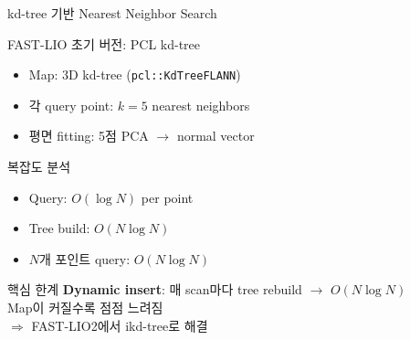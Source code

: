 \begin{frame}{kd-tree 기반 Nearest Neighbor Search}
  \begin{block}{FAST-LIO 초기 버전: PCL kd-tree}
    \begin{itemize}
      \item Map: 3D kd-tree (\texttt{pcl::KdTreeFLANN})
      \item 각 query point: $k=5$ nearest neighbors
      \item 평면 fitting: 5점 PCA $\to$ normal vector
    \end{itemize}
  \end{block}
  \pause
  \begin{block}{복잡도 분석}
    \begin{itemize}
      \item Query: $O(\log N)$ per point
      \item Tree build: $O(N \log N)$
      \item $N$개 포인트 query: $O(N \log N)$
    \end{itemize}
  \end{block}
  \pause
  \begin{alertblock}{핵심 한계}
    \textbf{Dynamic insert}: 매 scan마다 tree rebuild $\to$ $O(N\log N)$\\
    Map이 커질수록 점점 느려짐\\
    $\Rightarrow$ FAST-LIO2에서 ikd-tree로 해결
  \end{alertblock}
\end{frame}

